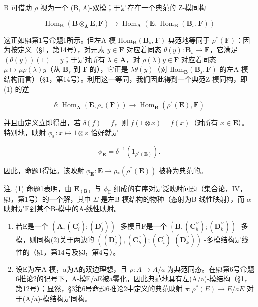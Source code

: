 B 可借助 \(\rho\) 视为一个 (B, A)-双模；于是存在一个典范的 Z-模同构

\[
\operatorname{Hom} _ {\mathbf {B}} (\mathbf {B} \otimes_ {\mathbf {A}} \mathbf {E}, \mathbf {F}) \rightarrow \operatorname{Hom} _ {\mathbf {A}} (\mathbf {E}, \operatorname{Hom} _ {\mathbf {B}} (\mathbf {B} _ {s}, \mathbf {F}))\tag{1}
\]

这正如§4第1号命题1所示。但左A-模 \(\mathrm{Hom}_{\mathbf{B}}(\mathbf{B}_{s},\mathbf{F})\) 典范地等同于 \(\rho^{*}(\mathbf{F})\)：因为按定义（§1，第14号），对元素 \(y\in \mathbf{F}\) 对应着同态 \(\theta (y)\colon \mathbf{B}_s\to \mathbf{F}\)，它满足 \((\theta (y))(1) = y\)；于是对所有 \(\lambda \in \mathbf{A}\)，对 \(\rho (\lambda)y\in \mathbf{F}\) 对应着同态 \(\mu \mapsto \mu \rho (\lambda)y\)（从 \(\mathbf{B}_s\) 到 \(\mathbf{F}\) 的），它正是 \(\lambda \theta (y)\)（对 \(\mathrm{Hom}_{\mathbf{B}}(\mathbf{B}_{s},\mathbf{F})\) 的左A-模结构而言）（§1，第14号）。利用这一等同，我们因此得到一个典范Z-模同构，即 (1) 的逆

\[
\delta : \operatorname{Hom} _ {\mathbf {A}} (\mathbf {E}, \rho_ {*} (\mathbf {F})) \rightarrow \operatorname{Hom} _ {\mathbf {B}} (\rho^ {*} (\mathbf {E}), \mathbf {F})\tag{2}
\]

并且由定义立即得出，若 \(\delta(f) = \bar{f}\)，则 \(\bar{f}(1 \otimes x) = f(x)\)（对所有 \(x \in \mathbf{E}\)）。特别地，映射 \(\phi_{\mathbb{E}}: x \mapsto 1 \otimes x\) 恰好就是

\[
\phi_ {\mathbf {E}} = \delta^ {- 1} (1 _ {\rho^ {*} (\mathbf {E})}).\tag{3}
\]

因此，命题1得证。该映射 \(\phi_{\mathbf{E}}: \mathbf{E} \to \rho_{*}(\rho^{*}(\mathbf{E}))\) 被称为典范的。

注. (1) 命题1表明，由 \(\mathbf{E}_{(\mathbf{B})}\) 与 \(\phi_{\mathbb{E}}\) 组成的有序对是泛映射问题（集合论，IV，§3，第1号）的一个解，其中 \(\Sigma\) 是左B-模结构的物种（态射为B-线性映射），而 \(\alpha\)-映射是E到某个B-模中的A-线性映射。

\begin{enumerate}
\def\labelenumi{(\arabic{enumi})}
\setcounter{enumi}{1}
\item
  若E是一个 \((\mathbf{A}, (\mathbf{C}_{i}^{\prime}); (\mathbf{D}_{j}^{\prime}))\) -多模且F是一个 \((\mathbf{B}, (\mathbf{C}_{h}^{\prime\prime}); (\mathbf{D}_{k}^{\prime\prime}))\) -多模，则同构(2)关于两边的 \(((\mathbf{D}_{j}^{\prime}), (\mathbf{C}_{h}^{\prime\prime}); (\mathbf{C}_{i}^{\prime}), (\mathbf{D}_{k}^{\prime\prime}))\) -多模结构是线性的（§1，第14号及§3，第4号）。
\item
  设E为左A-模，a为A的双边理想，且 \(\rho:A\to A/a\) 为典范同态。在§3第6号命题6推论2的记号下，A-模E/aE被a零化，因此典范地具有左(A/a)-模结构（§1，第12号）；显然，§3第6号命题6推论2中定义的典范映射 \(\pi:\rho^{*}(E)\to E/aE\) 对于(A/a)-模结构是同构。
\end{enumerate}

